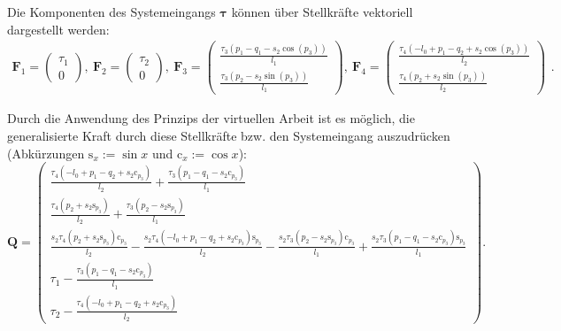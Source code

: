 Die Komponenten des Systemeingangs $\boldsymbol{\tau}$ können über Stellkräfte vektoriell dargestellt werden:
\begin{equation}
\begin{smallmatrix}
\mathbf{F}_1 =
\left(\begin{matrix}
\tau_{1} \\
0
\end{matrix}\right), \
\mathbf{F}_2 =
\left(\begin{matrix}
\tau_{2} \\
0
\end{matrix}\right), \
\mathbf{F}_3 =
\left(\begin{matrix}
\frac{\tau_{3} \left(p_{1} - q_{1} - s_{2} \cos{\left(p_{3} \right)}\right)}{l_{1}}\\
\frac{\tau_{3} \left(p_{2} - s_{2} \sin{\left(p_{3} \right)}\right)}{l_{1}}
\end{matrix}\right), \
\mathbf{F}_4 =
\left(\begin{matrix}
\frac{\tau_{4} \left(- l_{0} + p_{1} - q_{2} + s_{2} \cos{\left(p_{3} \right)}\right)}{l_{2}}\\
\frac{\tau_{4} \left(p_{2} + s_{2} \sin{\left(p_{3} \right)}\right)}{l_{2}}
\end{matrix}\right)
\end{smallmatrix}.
\end{equation}

Durch die Anwendung des Prinzips der virtuellen Arbeit ist es möglich, die generalisierte Kraft durch diese Stellkräfte bzw. den Systemeingang auszudrücken (Abkürzungen $\mathrm{s}_x := \sin{x}$ und $\mathrm{c}_x := \cos{x}$):
\begin{equation}
\mathbf{Q}=
\left(\begin{smallmatrix}
\frac{\tau_{4} \left(- l_{0} + p_{1} - q_{2} + s_{2} \mathrm{c}_{p_{3}}\right)}{l_{2}} + \frac{\tau_{3} \left(p_{1} - q_{1} - s_{2} \mathrm{c}_{p_{3}}\right)}{l_{1}}\\
\frac{\tau_{4} \left(p_{2} + s_{2} \mathrm{s}_{p_{3}}\right)}{l_{2}} + \frac{\tau_{3} \left(p_{2} - s_{2} \mathrm{s}_{p_{3}}\right)}{l_{1}}\\
\frac{s_{2} \tau_{4} \left(p_{2} + s_{2} \mathrm{s}_{p_{3}}\right) \mathrm{c}_{p_{3} }}{l_{2}} - \frac{s_{2} \tau_{4} \left(- l_{0} + p_{1} - q_{2} + s_{2} \mathrm{c}_{p_{3} }\right) \mathrm{s}_{p_{3}}}{l_{2}} - \frac{s_{2} \tau_{3} \left(p_{2} - s_{2} \mathrm{s}_{p_{3}}\right) \mathrm{c}_{p_{3}}}{l_{1}} + \frac{s_{2} \tau_{3} \left(p_{1} - q_{1} - s_{2} \mathrm{c}_{p_{3}}\right) \mathrm{s}_{p_{3}}}{l_{1}}\\
\tau_{1} - \frac{\tau_{3} \left(p_{1} - q_{1} - s_{2} \mathrm{c}_{p_{3} }\right)}{l_{1}}\\
\tau_{2} - \frac{\tau_{4} \left(- l_{0} + p_{1} - q_{2} + s_{2} \mathrm{c}_{p_{3} }\right)}{l_{2}}
\end{smallmatrix}\right).
\end{equation}

